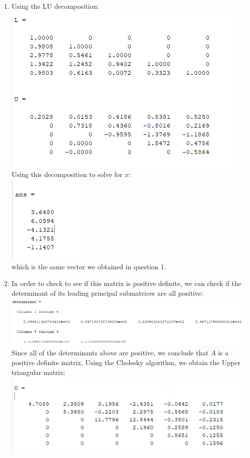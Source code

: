 \documentclass{article}
\begin{document}
\begin{enumerate}
    \item Using the LU decomposition: \\
    \includegraphics{3a.png}\\
    Using this decomposition to solve for $x$: \\
    \includegraphics{3b.png}\\
    which is the same vector we obtained in question 1. 
\pagebreak
    \item In order to check to see if this matrix is positive definite, we can check 
    if the determinant of its leading principal submatrices are all positive:\\
    \includegraphics[scale = .8]{4a.png}\\
    Since all of the determinants above are positive, we conclude that $A$ is a 
    positive definite matrix. Using the Cholesky algorithm, we obtain the Upper 
    triangular matrix: \\
    \includegraphics{4b.png}\\

\end{enumerate}
\end{document}
